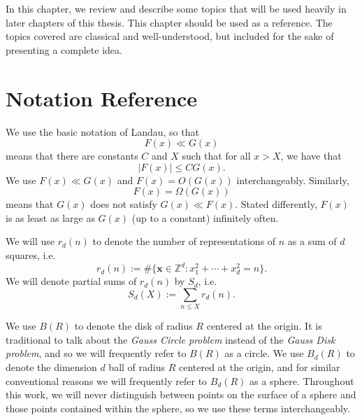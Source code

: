 
In this chapter, we review and describe some topics that will be used heavily in later
chapters of this thesis.
This chapter should be used as a reference.
The topics covered are classical and well-understood, but included for the sake of
presenting a complete idea.



\section{Notation Reference}

We use the basic notation of Landau, so that
\begin{equation}
  F(x) \ll G(x)
\end{equation}
means that there are constants $C$ and $X$ such that for all $x > X$, we have that
\begin{equation}
  \lvert F(x) \rvert \leq C G(x).
\end{equation}
We use $F(x) \ll G(x)$ and $F(x) = O(G(x))$ interchangeably.
Similarly,
\begin{equation}
  F(x) = \Omega(G(x))
\end{equation}
means that $G(x)$ does not satisfy $G(x) \ll F(x)$.
Stated differently, $F(x)$ is as least as large as $G(x)$ (up to a constant) infinitely
often.



We will use $r_d(n)$ to denote the number of representations of $n$ as a sum of $d$
squares, i.e.\
\begin{equation}
  r_d(n) := \# \{ \bm x \in \mathbb{Z}^d : x_1^2 + \cdots + x_d^2 = n \}.
\end{equation}
We will denote partial sums of $r_d(n)$ by $S_d$, i.e.\
\begin{equation}
  S_d(X) := \sum_{n \leq X} r_d(n).
\end{equation}


We use $B(R)$ to denote the disk of radius $R$ centered at the origin.
It is traditional to talk about the \emph{Gauss Circle problem} instead of the \emph{Gauss
Disk problem}, and so we will frequently refer to $B(R)$ as a circle.
We use $B_d(R)$ to denote the dimension $d$ ball of radius $R$ centered at the origin, and
for similar conventional reasons we will frequently refer to $B_d(R)$ as a sphere.
Throughout this work, we will never distinguish between points on the surface of a sphere
and those points contained within the sphere, so we use these terms interchangeably.


